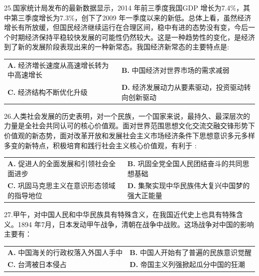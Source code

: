 \documentclass[UTF8,11pt]{ctexart}
\begin{document}
25.国家统计局发布的最新数据显示，2014 年前三季度我国GDP 增长为7.4\%，其中第三季度增长为7.3\%，创下了2009 年一季度以来的新低。总体上看，虽然经济增长有所放缓，但国民经济继续运行在合理区间，稳中有进的态势没有变，今后一个时期经济保持平稳较快发展的可能性仍然较大。这是一种趋势性的变化，是经济到了新的发展阶段表现出来的一种新常态。我国经济新常态的主要特点是:


\begin{center}\begin{tabular}{>{\raggedright\arraybackslash}p{\dimexpr(\linewidth-4\tabcolsep)/2\relax}>{\raggedright\arraybackslash}p{\dimexpr(\linewidth-4\tabcolsep)/2\relax}}
\textbf{A.} 经济増长速度从高速增长转为中高速增长 & \textbf{B.} 中国经济对世界市场的需求减弱\\[.35em]
\textbf{C.} 经济结构不断优化升级 & \textbf{D.} 经济发展动力从要素驱动，投资驱动转向创新驱动\\[.35em]\end{tabular}\end{center}

26.人类社会发展的历史表明，对一个民族，一个国家来说，最持久、最深层次的力量是全社会共同认可的核心价值观。面对世界范围思想文化交流交融交锋形势下价值观的新态势，面对改革开放和发展社会主义市场经济条件下思想意识多元多样多变的新特点，积极培育和践行社会主义核心价值观，有利于 :


\begin{center}\begin{tabular}{>{\raggedright\arraybackslash}p{\dimexpr(\linewidth-4\tabcolsep)/2\relax}>{\raggedright\arraybackslash}p{\dimexpr(\linewidth-4\tabcolsep)/2\relax}}
\textbf{A.} 促进人的全面发展和引领社会全面进步 & \textbf{B.} 巩固全党全国人民团结奋斗的共同思想基础\\[.35em]
\textbf{C.} 巩固马克思主义在意识形态领域的指导地位 & \textbf{D.} 集聚实现中华民族伟大复兴中国梦的强大正能量\\[.35em]\end{tabular}\end{center}

27.甲午，对中国人民和中华民族具有特殊含义，在我国近代史上也具有特殊含义。1894 年7月，日本发动甲午战争，清朝在战争中战败。这场战争对中国的影响主要有：


\begin{center}\begin{tabular}{>{\raggedright\arraybackslash}p{\dimexpr(\linewidth-4\tabcolsep)/2\relax}>{\raggedright\arraybackslash}p{\dimexpr(\linewidth-4\tabcolsep)/2\relax}}
\textbf{A.} 中国海关的行政权落入外国人手中 & \textbf{B.} 中国人开始有了普遍的民族意识觉醒\\[.35em]
\textbf{C.} 台湾被日本侵占 & \textbf{D.} 帝国主义列强掀起瓜分中国的狂潮\\[.35em]\end{tabular}\end{center}
\end{document}
